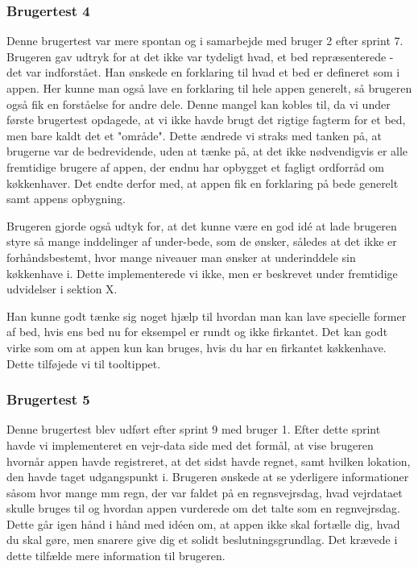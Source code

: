 \subsubsection{Brugertest 4}

Denne brugertest var mere spontan og i samarbejde med bruger 2 efter sprint 7. Brugeren gav udtryk for at det ikke var tydeligt hvad, et bed repræsenterede - det var indforstået. Han ønskede en forklaring til hvad et bed er defineret som i appen. Her kunne man også lave en forklaring til hele appen generelt, så brugeren også fik en forståelse for andre dele. Denne mangel kan kobles til, da vi under første brugertest opdagede, at vi ikke havde brugt det rigtige fagterm for et bed, men bare kaldt det et "område". Dette ændrede vi straks med tanken på, at brugerne var de bedrevidende, uden at tænke på, at det ikke nødvendigvis er alle fremtidige brugere af appen, der endnu har opbygget et fagligt ordforråd om køkkenhaver. Det endte derfor med, at appen fik en forklaring på bede generelt samt appens opbygning.

Brugeren gjorde også udtyk for, at det kunne være en god idé at lade brugeren styre så mange inddelinger af under-bede, som de ønsker, således at det ikke er forhåndsbestemt, hvor mange niveauer man ønsker at underinddele sin køkkenhave i. Dette implementerede vi ikke, men er beskrevet under fremtidige udvidelser i sektion X.

Han kunne godt tænke sig noget hjælp til hvordan man kan lave specielle former af bed, hvis ens bed nu for eksempel er rundt og ikke firkantet. Det kan godt virke som om at appen kun kan bruges, hvis du har en firkantet køkkenhave. Dette tilføjede vi til tooltippet.

\subsubsection{Brugertest 5}
Denne brugertest blev udført efter sprint 9 med bruger 1. Efter dette sprint havde vi implementeret en vejr-data side med det formål, at vise brugeren hvornår appen havde registreret, at det sidst havde regnet, samt hvilken lokation, den havde taget udgangspunkt i. Brugeren ønskede at se yderligere informationer såsom hvor mange mm regn, der var faldet på en regnsvejrsdag, hvad vejrdataet skulle bruges til og hvordan appen vurderede om det talte som en regnvejrsdag. Dette går igen hånd i hånd med idéen om, at appen ikke skal fortælle dig, hvad du skal gøre, men snarere give dig et solidt beslutningsgrundlag. Det krævede i dette tilfælde mere information til brugeren.

